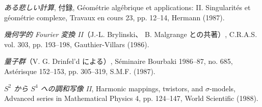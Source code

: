 \begin{description}
\item[{[46]}] \emph{ある悲しい計算}, 付録, Géométrie algébrique et
applications: II. Singularités et géométrie complexe, Travaux en cours 23,
pp. 12--14, Hermann (1987).

\item[{[47]}] \emph{幾何学的 Fourier 変換 II}（J.-L. Brylinski、
B. Malgrange との共著）, C.R.A.S. vol. 303, pp. 193--198,
Gauthier-Villars (1986).

\item[{[48]}] \emph{量子群}（V. G. Drinfel'd による）, Séminaire
Bourbaki 1986--87, no. 685, Astérisque 152--153, pp. 305--319,
S.M.F. (1987).

\item[{[49]}] \emph{$S^2$ から $S^4$ への調和写像 II}, Harmonic mappings,
twistors, and $\sigma$-models, Advanced series in Mathematical Physics 4,
pp. 124--147, World Scientific (1988).
\end{description}
\normalsize

